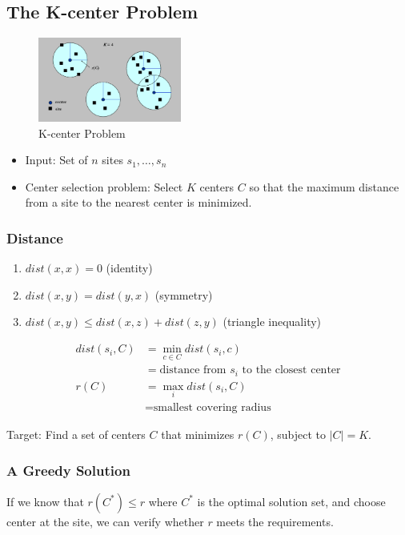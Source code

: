 \subsection{The K-center Problem}
\begin{figure}[!htb]
    \centering
    \includegraphics[width=0.42\textwidth]{pic/ADS11/K-center Problem.png}
    \caption{K-center Problem}
\end{figure}

\begin{itemize}
    \item Input: Set of $n$ sites $s_1, \dots, s_n$
    \item Center selection problem: Select $K$ centers $C$ so that the maximum distance from a site to the nearest center is minimized.
\end{itemize}

\subsubsection{Distance}
\begin{enumerate}
    \item  $dist(x, x) = 0$ (identity)
    \item $dist(x, y) = dist(y, x)$ (symmetry)
    \item $dist(x, y) \le dist(x, z) + dist(z, y)$ (triangle inequality)
\end{enumerate}
\begin{align*}
    dist(s_i , C) &= \min_{c\in C} dist(s_i, c)  \\
    &= \text{distance from $s_i$ to the closest center}\\
    r(C) &= \max_i dist(s_i, C) \\
    &= \text{smallest covering radius}
\end{align*}

Target: Find a set of centers $C$ that minimizes $r(C)$, subject to $|C| = K$.


\subsubsection{A Greedy Solution}
If we know that $r(C^*) \le r$ where $C^*$ is the optimal solution set, and choose center at  the site, we can verify whether $r$ meets the requirements. 

